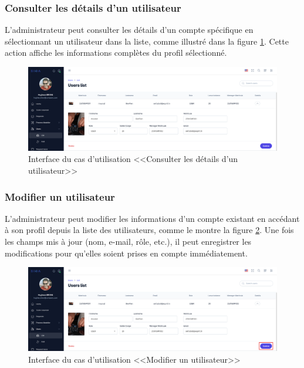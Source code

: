 \subsubsection{Consulter les détails d'un utilisateur}
L’administrateur peut consulter les détails d’un compte spécifique en sélectionnant un utilisateur dans la liste, comme illustré dans la figure \ref{fig:userdetails}. Cette action affiche les informations complètes du profil sélectionné.
\begin{figure}[H]
     \centering
     \includegraphics[width=16cm]{images/realisation/dUser.png}
     \caption{Interface du cas d'utilisation <<Consulter les détails d'un utilisateur>>}
     \label{fig:userdetails}
\end{figure}
\newpage
\subsubsection{Modifier un utilisateur}
L’administrateur peut modifier les informations d’un compte existant en accédant à son profil depuis la liste des utilisateurs, comme le montre la figure \ref{fig:edituser}. Une fois les champs mis à jour (nom, e-mail, rôle, etc.), il peut enregistrer les modifications pour qu’elles soient prises en compte immédiatement.
\begin{figure}[H]
     \centering
     \includegraphics[width=16cm]{images/realisation/mUser.png}
     \caption{Interface du cas d'utilisation <<Modifier un utilisateur>>}
     \label{fig:edituser}
\end{figure}
